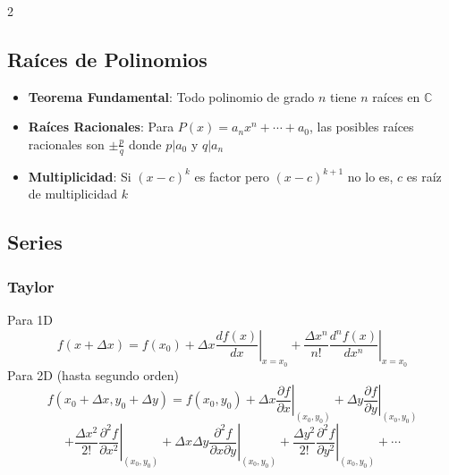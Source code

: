 \begin{multicols}{2}
              \subsection*{Raíces de Polinomios}
              \begin{itemize}[leftmargin=*]
                \item \textbf{Teorema Fundamental}:
                  Todo polinomio de grado $n$ tiene $n$ raíces en $\mathbb{C}$

                \item \textbf{Raíces Racionales}:
                  Para $P(x) = a_nx^n + \cdots + a_0$, las posibles raíces racionales son $\pm \frac{p}{q}$ donde $p|a_0$ y $q|a_n$

                \item \textbf{Multiplicidad}:
                  Si $(x-c)^k$ es factor pero $(x-c)^{k+1}$ no lo es, $c$ es raíz de multiplicidad $k$
              \end{itemize}
              \subsection{Series}
              \subsubsection{Taylor}

              Para 1D
              $$f(x+ \Delta x)=f(x_0)+\Delta x \left.\dfrac{df(x)}{dx}\right|_{x=x_0}+\dfrac{\Delta x^n}{n!} \left.\dfrac{d^nf(x)}{dx^n}\right|_{x=x_0}$$
              Para 2D (hasta segundo orden)
              $$
              f(x_0+\Delta x, y_0+ \Delta y)=f(x_0,y_0)+\Delta x\left.\dfrac{\partial f}{\partial x}\right|_{(x_0,y_0)}+\Delta y\left.\dfrac{\partial f}{\partial y}\right|_{(x_0,y_0)}
              $$
              $$
              +\dfrac{\Delta x^2}{2!} \left. \dfrac{\partial^2 f}{\partial x^2}\right|_{(x_0,y_0)}+\Delta x\Delta y \left. \dfrac{\partial^2 f}{\partial x\partial y}\right|_{(x_0,y_0)}+\dfrac{\Delta y^2}{2!} \left. \dfrac{\partial^2 f}{\partial y^2}\right|_{(x_0,y_0)}+\cdots
              $$

            \end{multicols}

            \newpage
